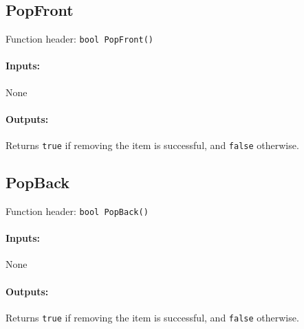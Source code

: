     \begin{framed}
    \subsection{PopFront}

    Function header: \texttt{bool    PopFront()}

    \paragraph{Inputs:}
        None

    \paragraph{Outputs:}
        Returns \texttt{true} if removing the item is successful, and \texttt{false} otherwise.

    \end{framed}
    
    \begin{framed}
    \subsection{PopBack}

    Function header: \texttt{bool    PopBack()}

    \paragraph{Inputs:}
        None

    \paragraph{Outputs:}
        Returns \texttt{true} if removing the item is successful, and \texttt{false} otherwise.

    \end{framed}
    
